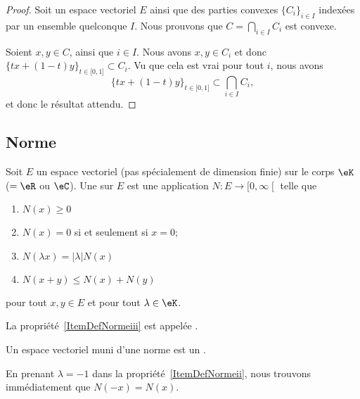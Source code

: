 \begin{proof}
	Soit un espace vectoriel \( E\) ainsi que des parties convexes \( \{  C_i \}_{i\in I}\) indexées par un ensemble quelconque \( I\). Nous prouvons que \( C= \bigcap_{i\in I}C_i\) est convexe.

	Soient \( x, y\in C\), ainsi que \( i\in I\). Nous avons \( x,y\in C_i\) et donc \( \{ tx+(1-t)y \}_{t\in \mathopen[ 0 , 1 \mathclose]}\subset C_i\). Vu que cela est vrai pour tout \( i\), nous avons
	\begin{equation}
		\{ tx+(1-t)y \}_{t\in \mathopen[ 0 , 1 \mathclose]}\subset \bigcap_{i\in I}C_i,
	\end{equation}
	et donc le résultat attendu.
\end{proof}

\subsection{Norme}

\begin{definition}  \label{DefNorme}
	Soit \( E\) un espace vectoriel (pas spécialement de dimension finie) sur le corps \( \eK\) (\( =\eR\) ou \( \eC\)). Une   sur \( E\) est une application \( N\colon E\to\mathopen[ 0 , \infty \mathclose[\) telle que
	\begin{enumerate}
		\item
		      \( N(x)\geq 0\)
		\item
		      \( N(x)=0\) si et seulement si \( x=0\);
		      \item\label{ItemDefNormeii}
		      \( N(\lambda x)=| \lambda |N(x)\)
		      \item\label{ItemDefNormeiii}
		      \( N(x+y)\leq N(x)+N(y)\)
	\end{enumerate}
	pour tout \( x,y\in E\) et pour tout \( \lambda\in\eK\).

	La propriété~\ref{ItemDefNormeiii} est appelée .

	Un espace vectoriel muni d'une norme est un .
\end{definition}
En prenant \( \lambda=-1\) dans la propriété~\ref{ItemDefNormeii}, nous trouvons immédiatement que \( N(-x)=N(x)\).

